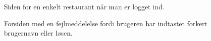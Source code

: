 \documentclass[a4paper, 12pt]{article}
\begin{document}
\begin{figure}[hp]
  \centering
  \caption{Siden for en enkelt restaurant når man er logget ind.}
\end{figure}

\begin{figure}[hp]
  \centering
  \caption{Forsiden med en fejlmeddelelse fordi brugeren har indtastet
    forkert brugernavn eller løsen.}
\end{figure}
\end{document}
